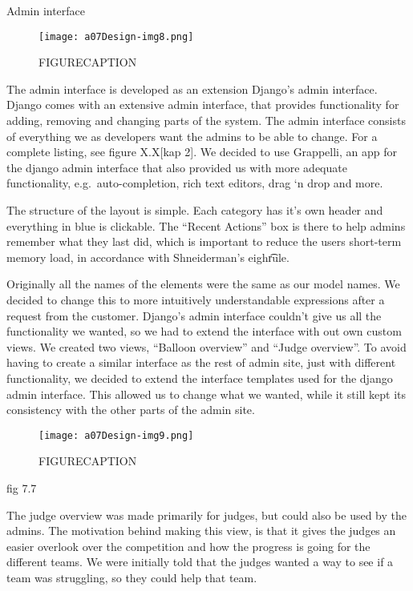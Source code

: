 Admin interface
 \begin{figure}[h!]
	\texttt{[image: a07Design-img8.png]} 
	\caption{FIGURECAPTION}
\end{figure}

The admin interface is developed as an extension
Django's admin interface. Django comes with an
extensive admin interface, that provides functionality for adding,
removing and changing parts of the system. The admin interface consists
of everything we as developers want the admins to be able to change.
For a complete listing, see figure X.X[kap 2]. We decided to use
Grappelli, an app for the django admin interface that also provided us
with more adequate functionality, e.g.\ auto-completion, rich text
editors, drag {\textquoteleft}n drop and more.

The structure of the layout is simple. Each category has
it's own header and everything in blue is clickable.
The ``Recent Actions'' box is there
to help admins remember what they last did, which is important to
reduce the users short-term memory load, in accordance with
Shneiderman's eigh\t rule.

Originally all the names of the elements were the same as our model
names. We decided to change this to more intuitively understandable
expressions after a request from the customer. Django's
admin interface couldn't give us all the functionality
we wanted, so we had to extend the interface with out own custom views.
We created two views, ``Balloon
overview'' and ``Judge
overview''. To avoid having to create a similar
interface as the rest of admin site, just with different functionality,
we decided to extend the interface templates used for the django admin
interface. This allowed us to change what we wanted, while it still
kept its consistency with the other parts of the admin site.



 \begin{figure}[h!]
	\texttt{[image: a07Design-img9.png]} 
	\caption{FIGURECAPTION}
\end{figure}
fig 7.7

The judge overview was made primarily for judges, but could also be used
by the admins. The motivation behind making this view, is that it gives
the judges an easier overlook over the competition and how the progress
is going for the different teams. We were initially told that the
judges wanted a way to see if a team was struggling, so they could help
that team.

